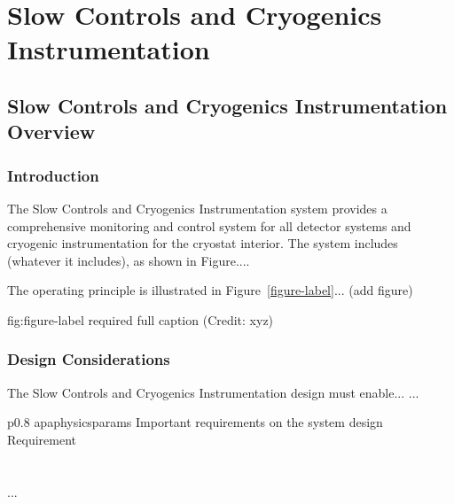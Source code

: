 \chapter{Slow Controls and Cryogenics Instrumentation}
\label{ch:fddp-slow-cryo}

\section{Slow Controls and Cryogenics Instrumentation Overview}
\label{sec:fddp-slow-cryo-ov}


\subsection{Introduction}
\label{sec:fddp-slow-cryo-intro}

The Slow Controls and Cryogenics Instrumentation system provides a
comprehensive monitoring and control system for all detector systems
and cryogenic instrumentation for the cryostat interior.
The system includes (whatever it includes), as shown in Figure.... 


The operating principle is illustrated in Figure~\ref{figure-label}... (add figure)

\begin{dunefigure}{fig:figure-label}
{required full caption (Credit: xyz)}
\end{dunefigure}

\subsection{Design Considerations}
\label{sec:fddp-slow-cryo-des-consid}


The Slow Controls and Cryogenics Instrumentation design must enable... 
...


\begin{dunetable}
{p{0.8\textwidth}}
{apaphysicsparams}
{Important requirements on the system design}   
Requirement  \\ \toprowrule
  \\ \colhline
   \\ \colhline
 ...\\ 
\end{dunetable}

